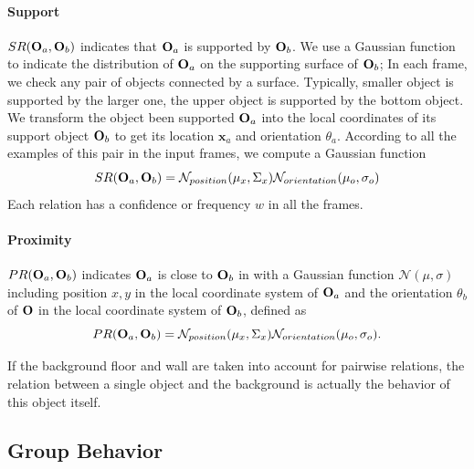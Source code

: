 \paragraph{Support} $SR(\mathbf{O}_a,\mathbf{O}_b)$ indicates that $\mathbf{O}_a$ is supported by $\mathbf{O}_b$. We use a Gaussian function to indicate the distribution of $\mathbf{O}_a$ on the supporting surface of $\mathbf{O}_b$;
%
In each frame, we check any pair of objects connected by a surface. 
Typically, smaller object is supported by the larger one, the upper object is supported by the bottom object.
%
We transform the object been supported $\mathbf{O}_a$ into the local coordinates of its support object $\mathbf{O}_b$ to get its location $\mathbf{x}_a$ and orientation $\theta_a$.
%
According to all the examples of this pair in the input frames, we compute a Gaussian function
\begin{equation}
	\label{eq:sr_ab}
	SR(\mathbf{O}_a,\mathbf{O}_b) = \mathcal{N}_{position}(\mathbf{\mu}_{x},\Sigma_{x}) \mathcal{N}_{orientation}(\mu_{o},\sigma_{o})
\end{equation} 
Each relation has a confidence or frequency $w$ in all the frames. 




\paragraph{Proximity} $PR(\mathbf{O}_a,\mathbf{O}_b)$ indicates $\mathbf{O}_a$ is close to $\mathbf{O}_b$ in with a Gaussian function $\mathcal{N}(\mu,\sigma)$ including position $x,y$ in the local coordinate system of $\mathbf{O}_a$ and the orientation $\theta_b$ of $\mathbf{O}$  in the local coordinate system of $\mathbf{O}_b$, defined as 
%
\begin{equation}
	\label{eq:proximity_ab}
	PR(\mathbf{O}_a,\mathbf{O}_b) = \mathcal{N}_{position}(\mathbf{\mu}_{x},\Sigma_{x}) \mathcal{N}_{orientation}(\mu_{o},\sigma_{o}).
\end{equation} 



If the background floor and wall are taken into account for pairwise relations, the relation between a single object and the background is actually the behavior of this object itself.




\subsection{Group Behavior}
\label{sec:groupbehavior}

